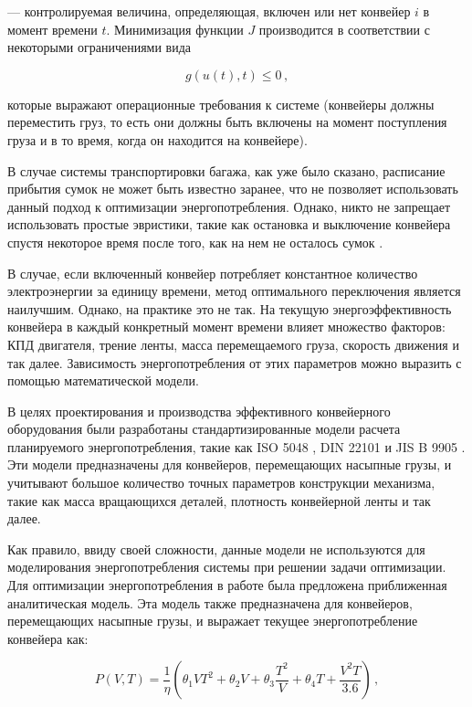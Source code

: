 \documentclass[specification,annotation,times]{itmo-student-thesis}
\theoremstyle{definition}
\begin{document}
--- контролируемая величина, определяющая, включен или нет конвейер $i$ в момент
времени $t$. Минимизация функции $J$ производится в соответствии с некоторыми
ограничениями вида

\begin{equation}\label{energy:opt-switching-g}
  g(u(t), t) \leq 0 \,,
\end{equation}

которые выражают операционные требования к системе (конвейеры должны
переместить груз, то есть они должны быть включены на момент поступления груза и
в то время, когда он находится на конвейере).

В случае системы транспортировки багажа, как уже было сказано, расписание
прибытия сумок не может быть известно заранее, что не позволяет использовать
данный подход к оптимизации энергопотребления. Однако, никто не запрещает
использовать простые эвристики, такие как остановка и выключение конвейера
спустя некоторое время после того, как на нем не осталось сумок
\cite{mukhutdinov2019multi}.

В случае, если включенный конвейер потребляет константное количество
электроэнергии за единицу времени, метод оптимального переключения является
наилучшим. Однако, на практике это не так.
На текущую энергоэффективность конвейера в каждый
конкретный момент времени влияет множество факторов: КПД двигателя, трение
ленты, масса перемещаемого груза, скорость движения и так далее. Зависимость
энергопотребления от этих параметров можно выразить с помощью математической
модели.

В целях проектирования и производства эффективного конвейерного
оборудования были разработаны стандартизированные модели расчета планируемого
энергопотребления, такие как ISO 5048 \cite{ISO5048}, DIN 22101 \cite{DIN22101}
и JIS B 9905 \cite{JISB8805}. Эти модели предназначены для конвейеров,
перемещающих насыпные грузы, и учитывают большое количество точных параметров
конструкции механизма, такие как масса вращающихся деталей, плотность
конвейерной ленты и так далее.

Как правило, ввиду своей сложности, данные модели не используются для
моделирования энергопотребления системы при решении задачи оптимизации. Для
оптимизации энергопотребления в работе \cite{zhang2011modeling} была предложена
приближенная аналитическая модель. Эта модель также предназначена для
конвейеров, перемещающих насыпные грузы, и выражает текущее энергопотребление
конвейера как:

\begin{equation}\label{energy:zhang-model}
  P(V, T) = \frac{1}{\eta} \left( \theta_1 VT^2 + \theta_2 V + \theta_3 \frac{T^2}{V}
  + \theta_4 T + \frac{V^2T}{3.6} \right) \,,
\end{equation}
\end{document}
